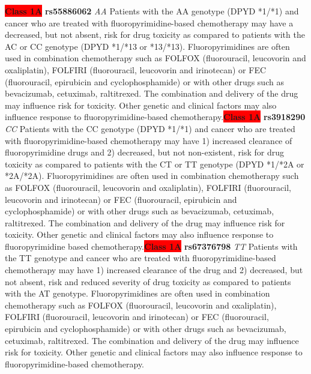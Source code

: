 \documentclass{book}
\begin{document}
\begin{center}
\textbf{\colorbox{red} {Class 1A}} \textbf{ rs55886062 } \textit{ AA }
Patients with the AA genotype (DPYD *1/*1) and cancer who are treated with fluoropyrimidine-based chemotherapy may have a decreased, but not absent, risk for drug toxicity as compared to patients with the AC or CC genotype (DPYD *1/*13 or *13/*13). Fluoropyrimidines are often used in combination chemotherapy such as FOLFOX (fluorouracil, leucovorin and oxaliplatin), FOLFIRI (fluorouracil, leucovorin and irinotecan) or FEC (fluorouracil, epirubicin and cyclophosphamide) or with other drugs such as bevacizumab, cetuximab, raltitrexed. The combination and delivery of the drug may influence risk for toxicity. Other genetic and clinical factors may also influence response to fluoropyrimidine-based chemotherapy.\textbf{\colorbox{red} {Class 1A}} \textbf{ rs3918290 } \textit{ CC }
Patients with the CC genotype (DPYD *1/*1) and cancer who are treated with fluoropyrimidine-based chemotherapy may have 1) increased clearance of fluoropyrimidine drugs and 2) decreased, but not non-existent, risk for drug toxicity as compared to patients with the CT or TT genotype (DPYD *1/*2A or *2A/*2A). Fluoropyrimidines are often used in combination chemotherapy such as FOLFOX (fluorouracil, leucovorin and oxaliplatin), FOLFIRI (fluorouracil,  leucovorin and irinotecan) or FEC (fluorouracil, epirubicin and cyclophosphamide) or with other drugs such as bevacizumab, cetuximab, raltitrexed. The combination and delivery of the drug may influence risk for toxicity. Other genetic and clinical factors may also influence response to fluoropyrimidine based chemotherapy.\textbf{\colorbox{red} {Class 1A}} \textbf{ rs67376798 } \textit{ TT }
Patients with the TT genotype and cancer who are treated with fluoropyrimidine-based chemotherapy may have 1) increased clearance of the drug and 2) decreased, but not absent, risk and reduced severity of drug toxicity as compared to patients with the AT genotype. Fluoropyrimidines are often used in combination chemotherapy such as FOLFOX (fluorouracil, leucovorin and oxaliplatin), FOLFIRI (fluorouracil, leucovorin and irinotecan) or FEC (fluorouracil, epirubicin and cyclophosphamide) or with other drugs such as bevacizumab, cetuximab, raltitrexed. The combination and delivery of the drug may influence risk for toxicity. Other genetic and clinical factors may also influence response to fluoropyrimidine-based chemotherapy.




\end{center}
\end{document}
